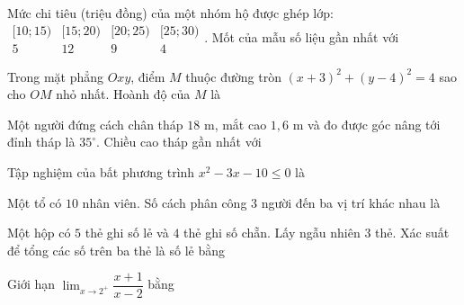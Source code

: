 \begin{ex}
Mức chi tiêu (triệu đồng) của một nhóm hộ được ghép lớp:
$\begin{array}{c|cccc}[10;15)&[15;20)&[20;25)&[25;30)\\\hline 5&12&9&4\end{array}$.
Mốt của mẫu số liệu gần nhất với
\end{ex}

\begin{ex}
Trong mặt phẳng $Oxy$, điểm $M$ thuộc đường tròn $(x+3)^2+(y-4)^2=4$ sao cho $OM$ nhỏ nhất. Hoành độ của $M$ là
\end{ex}

\begin{ex}
Một người đứng cách chân tháp $18$ m, mắt cao $1{,}6$ m và đo được góc nâng tới đỉnh tháp là $35^\circ$. Chiều cao tháp gần nhất với
\end{ex}

\begin{ex}
Tập nghiệm của bất phương trình $x^2-3x-10\le0$ là
\choice{$(-\infty;-2]\cup[5;+\infty)$}{$(-2;5)$}{\True $[-2;5]$}{$(-\infty;-2)\cup(5;+\infty)$}
\end{ex}

\begin{ex}
Một tổ có $10$ nhân viên. Số cách phân công $3$ người đến ba vị trí khác nhau là
\end{ex}

\begin{ex}
Một hộp có $5$ thẻ ghi số lẻ và $4$ thẻ ghi số chẵn. Lấy ngẫu nhiên $3$ thẻ. Xác suất để tổng các số trên ba thẻ là số lẻ bằng
\end{ex}

\begin{ex}
Giới hạn $\displaystyle\lim_{x\to2^+}\dfrac{x+1}{x-2}$ bằng
\end{ex}

